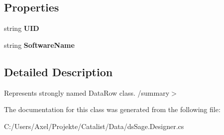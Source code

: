\subsection*{Properties}
\begin{DoxyCompactItemize}
\item 
string {\bfseries U\+ID}\hypertarget{class_products_1_1_data_1_1ds_sage_1_1_software_row_a213571c503a9c35554255724cac126d5}{}\label{class_products_1_1_data_1_1ds_sage_1_1_software_row_a213571c503a9c35554255724cac126d5}

\item 
string {\bfseries Software\+Name}\hypertarget{class_products_1_1_data_1_1ds_sage_1_1_software_row_a1743842253d42f11be3ef4c313f4fb44}{}\label{class_products_1_1_data_1_1ds_sage_1_1_software_row_a1743842253d42f11be3ef4c313f4fb44}

\end{DoxyCompactItemize}


\subsection{Detailed Description}
Represents strongly named Data\+Row class. /summary$>$ 

The documentation for this class was generated from the following file\+:\begin{DoxyCompactItemize}
\item 
C\+:/\+Users/\+Axel/\+Projekte/\+Catalist/\+Data/ds\+Sage.\+Designer.\+cs\end{DoxyCompactItemize}

